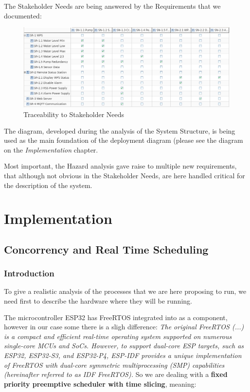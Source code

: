 \documentclass[11pt]{article}
\begin{document}
The Stakeholder Needs are being answered by the Requirements that we documented:

\begin{figure}[H]
  \centering
  \includegraphics[width=\linewidth]{../diagrams/traceability.png}
  \caption{Traceability to Stakeholder Needs}
  \label{fig:Traceability}
\end{figure}

The diagram, developed during the analysis of the System Structure, is being used as the main foundation of the deployment diagram (please see the diagram on the \textit{Implementation} chapter.

Most important, the Hazard analysis gave raise to multiple new requirements, that although not obvious in the Stakeholder Needs, are here handled critical for the description of the system.

\newpage
\section{Implementation}

\subsection{Concorrency and Real Time Scheduling}

\subsubsection{Introduction}

To give a realistic analysis of the processes that we are here proposing to run, we need first to describe the hardware where they will be running.

The microcontroller ESP32 has FreeRTOS integrated into as a component, however in our case some there is a sligh difference:
\newline
\newline
 \textit{The original FreeRTOS (...) is a compact and efficient real-time operating system supported on numerous single-core MCUs and SoCs. However, to support dual-core ESP targets, such as ESP32, ESP32-S3, and ESP32-P4, ESP-IDF provides a unique implementation of FreeRTOS with dual-core symmetric multiprocessing (SMP) capabilities (hereinafter referred to as IDF FreeRTOS).}\cite{c1}
\newline
\newline
So we are dealing with a \textbf{fixed priority preemptive scheduler with time slicing}, meaning:
\end{document}

